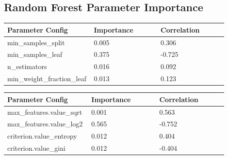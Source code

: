 \documentclass[11pt]{article}
\begin{document}
\begin{appendices}
\subsection{Random Forest Parameter Importance}
  \begin{table}[ht]
    \centering
    \begin{tabular}{|p{0.3\linewidth} | p{0.3\linewidth}| p{0.3\linewidth}|} 
      \hline
      \textbf{Parameter Config}  & \textbf{Importance} & \textbf{Correlation} \\ \hline
        min\_samples\_split & 0.005 & 0.306 \\ \hline
        min\_samples\_leaf & 0.375 & -0.725 \\ \hline
        n\_estimators & 0.016 & 0.092 \\ \hline
        min\_weight\_fraction\_leaf & 0.013 & 0.123 \\ \hline
    \end{tabular}
  \end{table}\label{RF_ParamImp1}

  \begin{table}[ht]
    \centering
    \begin{tabular}{|p{0.3\linewidth} | p{0.3\linewidth}| p{0.3\linewidth}|} 
      \hline
      \textbf{Parameter Config}  & \textbf{Importance} & \textbf{Correlation} \\ \hline
      max\_features.value\_sqrt & 0.001 & 0.563 \\ \hline
      max\_features.value\_log2 & 0.565 & -0.752 \\ \hline
      criterion.value\_entropy & 0.012 & 0.404 \\ \hline
      criterion.value\_gini & 0.012 & -0.404 \\ \hline
    \end{tabular}
  \end{table}\label{RF_ParamImp2}


\end{appendices}
\end{document}
